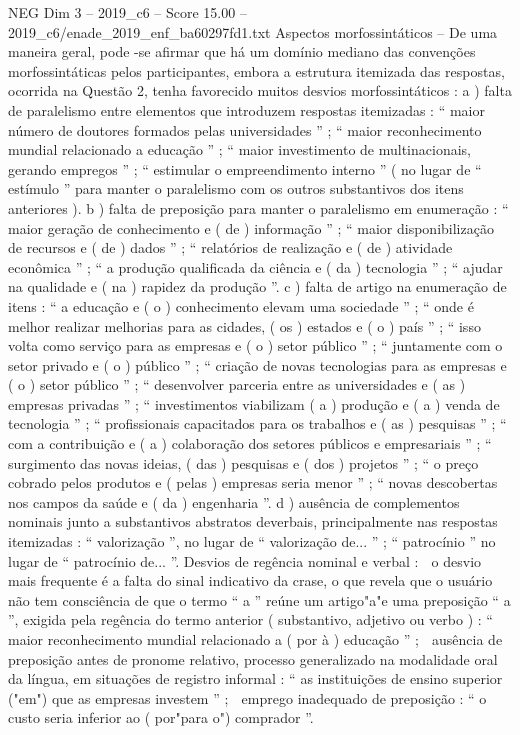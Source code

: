 \begin{textsample}{NEG Dim 3 – 2019\_c6 – Score 15.00 – 2019\_c6/enade\_2019\_enf\_ba60297fd1.txt}
Aspectos morfossintáticos – De uma maneira geral, pode -se afirmar que há um domínio mediano das convenções morfossintáticas pelos participantes, embora a estrutura itemizada das respostas, ocorrida na Questão 2, tenha favorecido muitos desvios morfossintáticos : a ) falta de paralelismo entre elementos que introduzem respostas itemizadas : “ maior número de doutores formados pelas universidades ” ; “ maior reconhecimento mundial relacionado a educação ” ; “ maior investimento de multinacionais, gerando empregos ” ; “ estimular o empreendimento interno ” ( no lugar de “ estímulo ” para manter o paralelismo com os outros substantivos dos itens anteriores ). b ) falta de preposição para manter o paralelismo em enumeração : “ maior geração de conhecimento e ( de ) informação ” ; “ maior disponibilização de recursos e ( de ) dados ” ; “ relatórios de realização e ( de ) atividade econômica ” ; “ a produção qualificada da ciência e ( da ) tecnologia ” ; “ ajudar na qualidade e ( na ) rapidez da produção ”. c ) falta de artigo na enumeração de itens : “ a educação e ( o ) conhecimento elevam uma sociedade ” ; “ onde é melhor realizar melhorias para as cidades, ( os ) estados e ( o ) país ” ; “ isso volta como serviço para as empresas e ( o ) setor público ” ; “ juntamente com o setor privado e ( o ) público ” ; “ criação de novas tecnologias para as empresas e ( o ) setor público ” ; “ desenvolver parceria entre as universidades e ( as ) empresas privadas ” ; “ investimentos viabilizam ( a ) produção e ( a ) venda de tecnologia ” ; “ profissionais capacitados para os trabalhos e ( as ) pesquisas ” ; “ com a contribuição e ( a ) colaboração dos setores públicos e empresariais ” ; “ surgimento das novas ideias, ( das ) pesquisas e ( dos ) projetos ” ; “ o preço cobrado pelos produtos e ( pelas ) empresas seria menor ” ; “ novas descobertas nos campos da saúde e ( da ) engenharia ”. d ) ausência de complementos nominais junto a substantivos abstratos deverbais, principalmente nas respostas itemizadas : “ valorização ”, no lugar de “ valorização de... ” ; “ patrocínio ” no lugar de “ patrocínio de... ”.
Desvios de regência nominal e verbal :  o desvio mais frequente é a falta do sinal indicativo da crase, o que revela que o usuário não tem consciência de que o termo “ a ” reúne um artigo"a"e uma preposição “ a ”, exigida pela regência do termo anterior ( substantivo, adjetivo ou verbo ) : “ maior reconhecimento mundial relacionado a ( por à ) educação ” ;  ausência de preposição antes de pronome relativo, processo generalizado na modalidade oral da língua, em situações de registro informal : “ as instituições de ensino superior ("em") que as empresas investem ” ;  emprego inadequado de preposição : “ o custo seria inferior ao ( por"para o") comprador ”.

\end{textsample}
